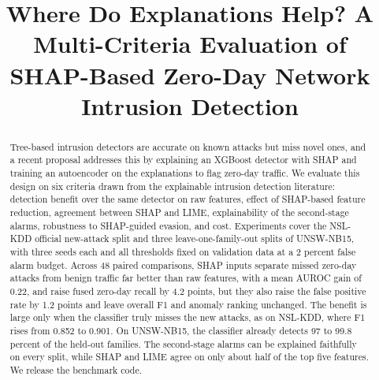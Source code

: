 \documentclass[conference]{IEEEtran}
\begin{document}
\title{Where Do Explanations Help? A Multi-Criteria Evaluation of SHAP-Based Zero-Day Network Intrusion Detection}

\author{
\and
{}
\and
{}
}

\maketitle

\begin{abstract}
Tree-based intrusion detectors are accurate on known attacks but miss novel ones, and a recent proposal addresses this by explaining an XGBoost detector with SHAP and training an autoencoder on the explanations to flag zero-day traffic. We evaluate this design on six criteria drawn from the explainable intrusion detection literature: detection benefit over the same detector on raw features, effect of SHAP-based feature reduction, agreement between SHAP and LIME, explainability of the second-stage alarms, robustness to SHAP-guided evasion, and cost. Experiments cover the NSL-KDD official new-attack split and three leave-one-family-out splits of UNSW-NB15, with three seeds each and all thresholds fixed on validation data at a 2 percent false alarm budget. Across 48 paired comparisons, SHAP inputs separate missed zero-day attacks from benign traffic far better than raw features, with a mean AUROC gain of 0.22, and raise fused zero-day recall by 4.2 points, but they also raise the false positive rate by 1.2 points and leave overall F1 and anomaly ranking unchanged. The benefit is large only when the classifier truly misses the new attacks, as on NSL-KDD, where F1 rises from 0.852 to 0.901. On UNSW-NB15, the classifier already detects 97 to 99.8 percent of the held-out families. The second-stage alarms can be explained faithfully on every split, while SHAP and LIME agree on only about half of the top five features. We release the benchmark code.
\end{abstract}
\end{document}

